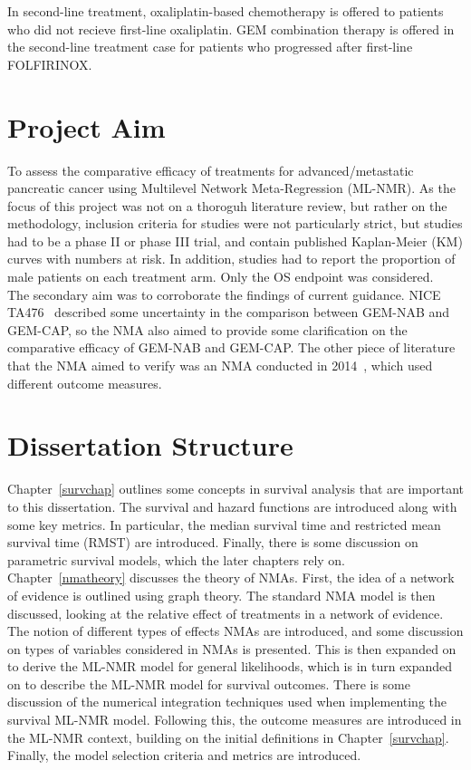 In second-line treatment, oxaliplatin-based chemotherapy is offered to patients who did not recieve first-line oxaliplatin. GEM combination therapy is offered in the second-line treatment case for patients who progressed after first-line FOLFIRINOX.

\section{Project Aim}\label{sec:aims}
To assess the comparative efficacy of treatments for advanced/metastatic pancreatic cancer using Multilevel Network Meta-Regression (ML-NMR). As the focus of this project was not on a thoroguh literature review, but rather on the methodology, inclusion criteria for studies were not particularly strict, but studies had to be a phase II or phase III trial, and contain published Kaplan-Meier (KM) curves with numbers at risk. In addition, studies had to report the proportion of male patients on each treatment arm. Only the OS endpoint was considered. \\

The secondary aim was to corroborate the findings of current guidance. NICE TA476~\cite{TA476} described some uncertainty in the comparison between GEM-NAB and GEM-CAP, so the NMA also aimed to provide some clarification on the comparative efficacy of GEM-NAB and GEM-CAP. The other piece of literature that the NMA aimed to verify was an NMA conducted in 2014~\cite{gresham2014}, which used different outcome measures. 

\section{Dissertation Structure}
Chapter~\ref{survchap} outlines some concepts in survival analysis that are important to this dissertation. The survival and hazard functions are introduced along with some key metrics. In particular, the median survival time and restricted mean survival time (RMST) are introduced. Finally, there is some discussion on parametric survival models, which the later chapters rely on. \\

Chapter~\ref{nmatheory} discusses the theory of NMAs. First, the idea of a network of evidence is outlined using graph theory. The standard NMA model is then discussed, looking at the relative effect of treatments in a network of evidence. The notion of different types of effects NMAs are introduced, and some discussion on types of variables considered in NMAs is presented. This is then expanded on to derive the ML-NMR model for general likelihoods, which is in turn expanded on to describe the ML-NMR model for survival outcomes. There is some discussion of the numerical integration techniques used when implementing the survival ML-NMR model. Following this, the outcome measures are introduced in the ML-NMR context, building on the initial definitions in Chapter~\ref{survchap}. Finally, the model selection criteria and metrics are introduced. \\

